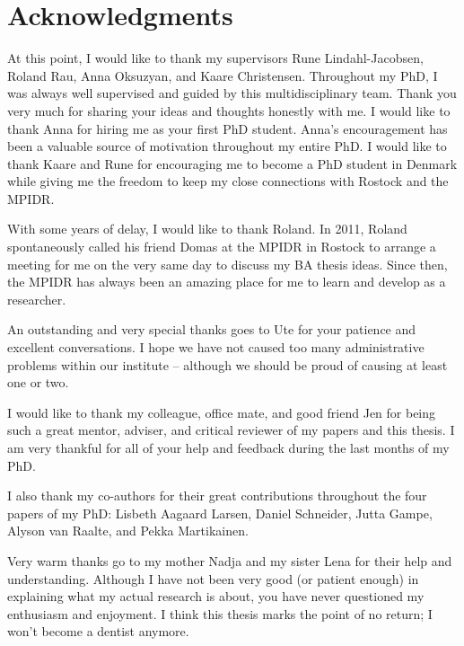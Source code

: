 



\chapter{Acknowledgments}

At this point, I would like to thank my supervisors Rune Lindahl-Jacobsen, 
Roland Rau, Anna Oksuzyan, and Kaare Christensen. Throughout my PhD, I was 
always well supervised and guided by this multidisciplinary team. Thank you 
very much for sharing your ideas and thoughts honestly with me. I would like 
to thank Anna for hiring me as your first PhD student. Anna's encouragement 
has been a valuable source of motivation throughout my entire PhD. I would 
like to thank Kaare and Rune for encouraging me to become a PhD student in 
Denmark while giving me the freedom to keep my close connections with Rostock 
and the MPIDR. 

With some years of delay, I would like to thank Roland. In 2011, Roland 
spontaneously called his friend Domas at the MPIDR in Rostock to arrange 
a meeting for me on the very same day to discuss my BA thesis ideas. 
Since then, the MPIDR has always been an amazing place for me to learn 
and develop as a researcher.

An outstanding and very special thanks goes to Ute for your patience and 
excellent conversations. I hope we have not caused too many administrative 
problems within our institute -- although we should be proud of causing at 
least one or two.

I would like to thank my colleague, office mate, and good friend Jen for 
being such a great mentor, adviser, and critical reviewer of my papers and 
this thesis. I am very thankful for all of your help and feedback during 
the last months of my PhD.

I also thank my co-authors for their great contributions throughout the 
four papers of my PhD: Lisbeth Aagaard Larsen, Daniel Schneider, Jutta 
Gampe, Alyson van Raalte, and Pekka Martikainen.

Very warm thanks go to my mother Nadja and my sister Lena for their help 
and understanding. Although I have not been very good (or patient enough) 
in explaining what my actual research is about, you have never questioned 
my enthusiasm and enjoyment. I think this thesis marks the point of no 
return; I won't become a dentist anymore.

